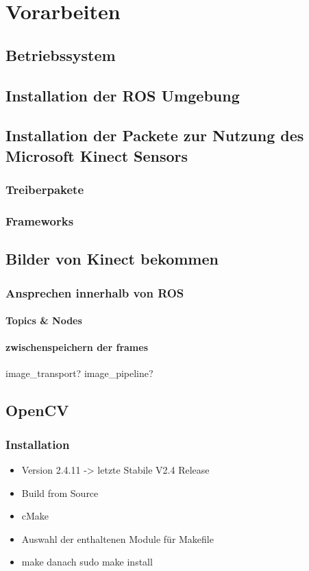 \chapter{Vorarbeiten}
	\section{Betriebssystem}
	\section{Installation der ROS Umgebung}
	\section{Installation der Packete zur Nutzung des Microsoft Kinect Sensors}
		\subsection{Treiberpakete}
		\subsection{Frameworks}
	\section{Bilder von Kinect bekommen}
		\subsection{Ansprechen innerhalb von ROS}
			\subsubsection{Topics \& Nodes}
			\subsubsection{zwischenspeichern der frames}
			image\_transport?
			image\_pipeline?
	\section{OpenCV}
		\subsection{Installation}
			\begin{itemize}
			\item Version 2.4.11 -> letzte Stabile V2.4 Release
			\item Build from Source
			\item cMake
			\item Auswahl der enthaltenen Module für Makefile
			\item make danach sudo make install
			\end{itemize}
